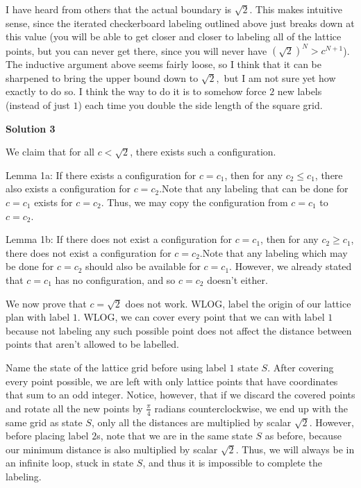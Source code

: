 \begin{enumerate}
 I have heard from others that the actual boundary is $\sqrt{2}.$ This makes intuitive sense, since the iterated checkerboard labeling outlined above just breaks down at this value (you will be able to get closer and closer to labeling all of the lattice points, but you can never get there, since you will never have $\left(\sqrt{2}\right)^N > c^{N+1}$). The inductive argument above seems fairly loose, so I think that it can be sharpened to bring the upper bound down to $\sqrt{2},$ but I am not sure yet how exactly to do so. I think the way to do it is to somehow force $2$ new labels (instead of just $1$) each time you double the side length of the square grid.

 



\textbf{Solution 3}

We claim that for all $c<\sqrt{2}$, there exists such a configuration. 

 Lemma 1a: If there exists a configuration for $c=c_1$, then for any $c_2\le{c_1}$, there also exists a configuration for $c=c_2$.Note that any labeling that can be done for $c=c_1$ exists for $c=c_2$. Thus, we may copy the configuration from $c=c_1$ to $c=c_2$. 

 Lemma 1b: If there does not exist a configuration for $c=c_1$, then for any $c_2\ge{c_1}$, there does not exist a configuration for $c=c_2$.Note that any labeling which may be done for $c=c_2$ should also be available for $c=c_1$. However, we already stated that $c=c_1$ has no configuration, and so $c=c_2$ doesn't either. 

 We now prove that $c=\sqrt{2}$ does not work. WLOG, label the origin of our lattice plan with label $1$. WLOG, we can cover every point that we can with label $1$ because not labeling any such possible point does not affect the distance between points that aren't allowed to be labelled. 

 Name the state of the lattice grid before using label $1$ state $S$. After covering every point possible, we are left with only lattice points that have coordinates that sum to an odd integer. Notice, however, that if we discard the covered points and rotate all the new points by $\frac{\pi}{4}$ radians counterclockwise, we end up with the same grid as state $S$, only all the distances are multiplied by scalar $\sqrt{2}$. However, before placing label $2$s, note that we are in the same state $S$ as before, because our minimum distance is also multiplied by scalar $\sqrt{2}$. Thus, we will always be in an infinite loop, stuck in state $S$, and thus it is impossible to complete the labeling. 


\end{enumerate}
